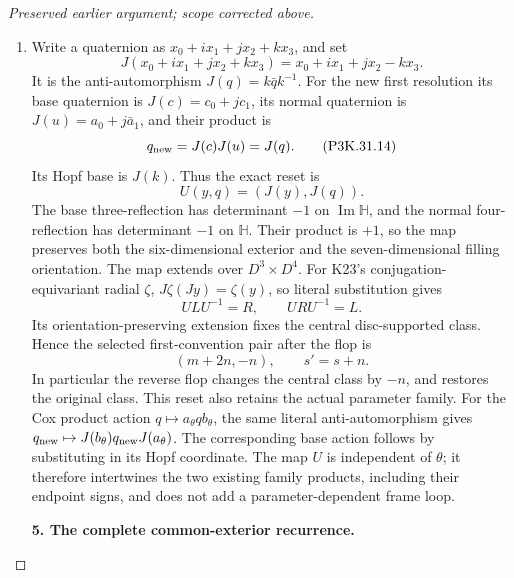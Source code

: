 \begin{proof}[Preserved earlier argument; scope corrected above]
\begin{enumerate}[label=\arabic*.]
\item Write a quaternion as \(x_0+ix_1+jx_2+kx_3\), and set
\[
 J(x_0+ix_1+jx_2+kx_3)=x_0+ix_1+jx_2-kx_3.
                                                        \tag{P3K.31.13}
\]
It is the anti-automorphism \(J(q)=k\bar q k^{-1}\).
For the new first resolution its base quaternion is
\(J(c)=c_0+jc_1\), its normal quaternion is
\(J(u)=a_0+j\bar a_1\), and their product is
\[
                      q_{\rm new}=J(c)J(u)=J(q).
                                                        \tag{P3K.31.14}
\]
Its Hopf base is \(J(k)\). Thus the exact reset is
\[
                       U(y,q)=(J(y),J(q)).
                                                        \tag{P3K.31.15}
\]
The base three-reflection has determinant \(-1\) on
\(\operatorname{Im}\mathbb H\), and the normal
four-reflection has determinant \(-1\) on
\(\mathbb H\). Their product is \(+1\), so the map
preserves both the six-dimensional exterior and
the seven-dimensional filling orientation.
The map extends over \(D^3\times D^4\).
For K23's conjugation-equivariant radial \(\zeta\),
\(J\zeta(Jy)=\zeta(y)\), so literal substitution gives
\[
                    ULU^{-1}=R,\qquad URU^{-1}=L.
                                                        \tag{P3K.31.16}
\]
Its orientation-preserving extension fixes the central
disc-supported class. Hence the selected first-convention
pair after the flop is
\[
                        (m+2n,-n),\qquad s'=s+n.
                                                        \tag{P3K.31.17}
\]
In particular the reverse flop changes the central class
by \(-n\), and restores the original class.
This reset also retains the actual parameter family.
For the Cox product action \(q\mapsto a_\theta q b_\theta\),
the same literal anti-automorphism gives
\(q_{\rm new}\mapsto J(b_\theta)q_{\rm new}J(a_\theta)\).
The corresponding base action follows by substituting
in its Hopf coordinate. The map \(U\) is independent of
\(\theta\); it therefore intertwines the two existing
family products, including their endpoint signs, and
does not add a parameter-dependent frame loop.

\par\medskip\noindent\textbf{5. The complete common-exterior recurrence.}\enspace


\end{enumerate}
\end{proof}
